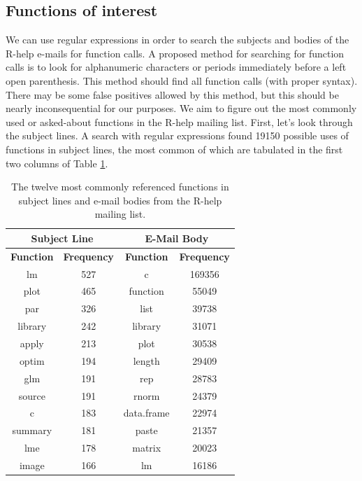 \documentclass[12pt, a4paper, oneside]{amsart}
\begin{document}
\subsection{Functions of interest}

We can use regular expressions in order to search the subjects and bodies of the R-help e-mails for function calls.  A proposed method for searching for function calls is to look for alphanumeric characters or periods immediately before a left open parenthesis.  This method should find all function calls (with proper syntax).  There may be some false positives allowed by this method, but this should be nearly inconsequential for our purposes.  We aim to figure out the most commonly used or asked-about functions in the R-help mailing list.  First, let's look through the subject lines.  A search with regular expressions found 19150 possible uses of functions in subject lines, the most common of which are tabulated in the first two columns of Table \ref{table:allFcns}.

 \begin{table}[ht]
 \centering
 \begin{tabular}{|c|c||c|c|}
 \hline
\multicolumn{2}{|c||}{Subject Line} & \multicolumn{2}{|c|}{E-Mail Body}\\
\hline
\footnotesize{\textbf{Function}}& \footnotesize{\textbf{Frequency}} & \footnotesize{\textbf{Function}}& \footnotesize{\textbf{Frequency}}\\
\hline
lm & 527 & c & 169356 \\
plot & 465 & function & 55049\\
par & 326 & list & 39738\\
library & 242 & library & 31071\\
apply & 213 & plot & 30538\\
optim & 194 & length & 29409\\
glm & 191 & rep & 28783\\
source & 191 & rnorm & 24379\\
c & 183 & data.frame & 22974\\
summary & 181 & paste & 21357\\
lme & 178 & matrix & 20023\\
image & 166 & lm & 16186\\
\hline
\end{tabular}
\caption{The twelve most commonly referenced functions in subject lines and e-mail bodies from the R-help mailing list.}
\label{table:allFcns}
\end{table}
\end{document}
